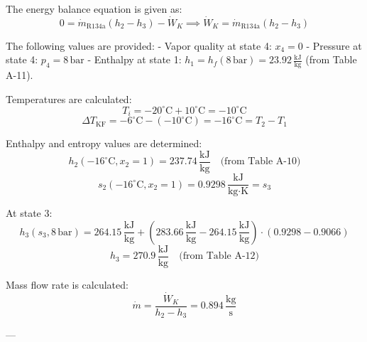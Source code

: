 The energy balance equation is given as:  
\[
0 = \dot{m}_{\text{R134a}} (h_2 - h_3) - \dot{W}_K \implies \dot{W}_K = \dot{m}_{\text{R134a}} (h_2 - h_3)
\]

The following values are provided:  
- Vapor quality at state 4: \( x_4 = 0 \)  
- Pressure at state 4: \( p_4 = 8 \, \text{bar} \)  
- Enthalpy at state 1: \( h_1 = h_f(8 \, \text{bar}) = 23.92 \, \frac{\text{kJ}}{\text{kg}} \) (from Table A-11).  

Temperatures are calculated:  
\[
T_i = -20^\circ\text{C} + 10^\circ\text{C} = -10^\circ\text{C}
\]
\[
\Delta T_{\text{KF}} = -6^\circ\text{C} - (-10^\circ\text{C}) = -16^\circ\text{C} = T_2 - T_1
\]

Enthalpy and entropy values are determined:  
\[
h_2(-16^\circ\text{C}, x_2 = 1) = 237.74 \, \frac{\text{kJ}}{\text{kg}} \quad \text{(from Table A-10)}
\]
\[
s_2(-16^\circ\text{C}, x_2 = 1) = 0.9298 \, \frac{\text{kJ}}{\text{kg·K}} = s_3
\]

At state 3:  
\[
h_3(s_3, 8 \, \text{bar}) = 264.15 \, \frac{\text{kJ}}{\text{kg}} + (283.66 \, \frac{\text{kJ}}{\text{kg}} - 264.15 \, \frac{\text{kJ}}{\text{kg}}) \cdot (0.9298 - 0.9066)
\]
\[
h_3 = 270.9 \, \frac{\text{kJ}}{\text{kg}} \quad \text{(from Table A-12)}
\]

Mass flow rate is calculated:  
\[
\dot{m} = \frac{\dot{W}_K}{h_2 - h_3} = 0.894 \, \frac{\text{kg}}{\text{s}}
\]

---